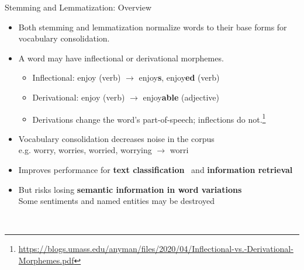 \documentclass{beamer}
\renewcommand{\cite}{\citep}
\begin{document}
\begin{frame}{Stemming and Lemmatization: Overview}
\begin{itemize}
\item Both stemming and lemmatization normalize words to their base forms for vocabulary consolidation.~\cite{manning2008introduction}
\item A word may have inflectional or derivational morphemes.
	\begin{itemize}
	\item Inflectional: enjoy (verb) $\rightarrow$ enjoy\textbf{s}, enjoy\textbf{ed} (verb)
	\item Derivational: enjoy (verb) $\rightarrow$ enjoy\textbf{able} (adjective)
	\item Derivations change the word's part-of-speech; inflections do not.\footnote{\url{https://blogs.umass.edu/anyman/files/2020/04/Inflectional-vs.-Derivational-Morphemes.pdf}}
	\end{itemize}
	\bigskip
\item Vocabulary consolidation decreases noise in the corpus\\
	e.g. worry, worries, worried, worrying $\rightarrow$ worri
\item Improves performance for \textbf{text classification}~\cite{biba2014boosting} and \textbf{information retrieval}~\cite{rajput2015survey}
\item But risks losing \textbf{semantic information in word variations}\\
	Some sentiments and named entities may be destroyed
	\vspace{-2.5pt}
	\begin{flushright}
	~\cite{bao2014role, cambria2017sentiment}
	\end{flushright}
\end{itemize}
\end{frame}


\end{document}
